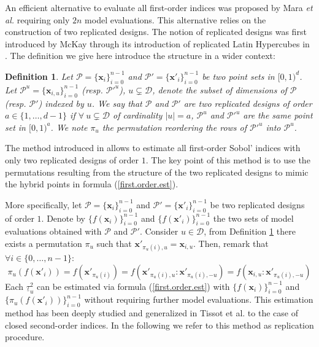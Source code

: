 \documentclass[]{elsarticle}
\newtheorem{definition}{Definition}
\theoremstyle{definition}
\newcommand{\bvec}[1]{\boldsymbol{#1}}
\newcommand{\vx}{\bvec{x}}
\begin{document}
An efficient alternative to evaluate all first-order indices was proposed by Mara \textit{et al.} \cite{Mara}  requiring only $2n$ model evaluations. This alternative relies on the construction of two replicated designs. The notion of replicated designs was first introduced by McKay through its introduction of replicated Latin Hypercubes in \cite{Mckay}. The definition we give here introduce the structure in a wider context:
\begin{definition}
\label{rep.designs}
Let $\mathcal{P}=\{\vx_i\}_{i=0}^{n-1}$ and $\mathcal{P}'=\{{\vx'}_i\}_{i=0}^{n-1}$ be two point sets in
$[0,1)^{d}$. Let $\mathcal{P}^u=\{\vx_{i,u}\}_{i=0}^{n-1}$ (resp. ${\mathcal{P}'}^u$), $u \subsetneq \mathcal{D}$, denote the subset of dimensions of $\mathcal{P}$ (resp. $\mathcal{P}'$) indexed by $u$. We say that $\mathcal{P}$ and $\mathcal{P}'$ are two replicated designs of order $a \in \{1,\dots,d-1\}$ if $\forall \ u \subsetneq \mathcal{D}$ of cardinality $|u|=a$, $\mathcal{P}^u$ and ${\mathcal{P}'}^u$ are the same point set in $[0,1)^a$. We note $\pi_u$ the permutation reordering the rows of ${\mathcal{P}'}^u$ into $\mathcal{P}^u$.
\end{definition}
The method introduced in \cite{Mara} allows to estimate all first-order Sobol' indices with only two replicated designs of order $1$. The key point of this method is to use the permutations resulting from the structure of the two replicated designs to mimic the hybrid points in formula (\ref{first.order.est}). 

More specifically, let $\mathcal{P}=\{\vx_i\}_{i=0}^{n-1}$ and $\mathcal{P}'=\{{\vx'}_i\}_{i=0}^{n-1}$ be two replicated designs of order $1$. Denote by $\{f(\vx_i)\}_{i=0}^{n-1}$ and $\{f({\vx'}_i)\}_{i=0}^{n-1}$ the two sets of model evaluations obtained with $\mathcal{P}$ and $\mathcal{P}'$. Consider $u \in \mathcal{D}$, from Definition \ref{rep.designs} there exists a permutation $\pi_u$ such that ${\vx'}_{\pi_u(i),u}={\vx}_{i,u}$. Then, remark that $\forall i \in \{0,\dots,n-1\}$:
\[\pi_u(f({\vx'}_i))=f({\vx'}_{\pi_u(i)})=f(\vx'_{\pi_u(i),u}:{\vx'}_{\pi_u(i),-u})=f(\vx_{i,u}:{\vx'}_{\pi_u(i),-u})\]
Each $\underline{\tau}^2_u$ can be estimated via formula (\ref{first.order.est}) with $\{f(\vx_i)\}_{i=0}^{n-1}$ and $\{\pi_u(f({\vx'}_i))\}_{i=0}^{n-1}$ without requiring further model evaluations. This estimation method has been deeply studied and generalized in Tissot et al. \cite{Mara} to the case of closed second-order indices. In the following we refer to this method as replication procedure.
\bigskip
\end{document}
